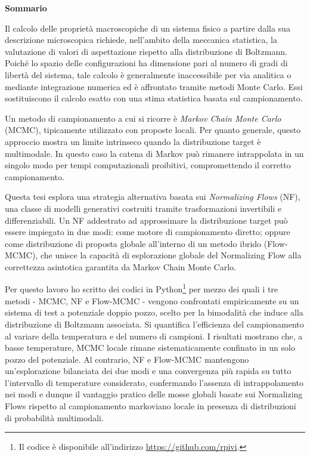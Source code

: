 \blankpage
\vspace*{1cm}
{\filcenter\Huge\bfseries Sommario\par}
\vspace{1cm}

Il calcolo delle proprietà macroscopiche di un sistema fisico a partire dalla sua descrizione microscopica richiede, nell'ambito della meccanica statistica, la valutazione di valori di aspettazione rispetto alla distribuzione di Boltzmann. Poiché lo spazio delle configurazioni ha dimensione pari al numero di gradi di libertà del sistema, tale calcolo è generalmente inaccessibile per via analitica o mediante integrazione numerica ed è affrontato tramite metodi Monte Carlo. Essi sostituiscono il calcolo esatto con una stima statistica basata sul campionamento.
 
Un metodo di campionamento a cui si ricorre è \emph{Markov Chain Monte Carlo} (MCMC), tipicamente utilizzato con proposte locali. Per quanto generale, questo approccio mostra un limite intrinseco quando la distribuzione target è multimodale. In questo caso la catena di Markov può rimanere intrappolata in un singolo modo per tempi computazionali proibitivi, compromettendo il corretto campionamento.
 
Questa tesi esplora una strategia alternativa basata sui \emph{Normalizing Flows} (NF), una classe di modelli generativi costruiti tramite trasformazioni invertibili e differenziabili. Un NF addestrato ad approssimare la distribuzione target può essere impiegato in due modi: come motore di campionamento diretto; oppure come distribuzione di proposta globale all'interno di un metodo ibrido (Flow-MCMC), che unisce la capacità di esplorazione globale del Normalizing Flow alla correttezza asintotica garantita da Markov Chain Monte Carlo.

Per questo lavoro ho scritto dei codici in Python\footnote{Il codice è disponibile all'indirizzo \url{https://github.com/rpivi}.} per mezzo dei quali i tre metodi - MCMC, NF e Flow-MCMC - vengono confrontati empiricamente su un sistema di test a potenziale doppio pozzo, scelto per la bimodalità che induce alla distribuzione di Boltzmann associata. Si quantifica l'efficienza del campionamento al variare della temperatura e del numero di campioni. I risultati mostrano che, a basse temperature, MCMC locale rimane sistematicamente confinato in un solo pozzo del potenziale. Al contrario, NF e Flow-MCMC mantengono un'esplorazione bilanciata dei due modi e una convergenza più rapida su tutto l'intervallo di temperature considerato, confermando l'assenza di intrappolamento nei modi e dunque il vantaggio pratico delle mosse globali basate sui Normalizing Flows rispetto al campionamento markoviano locale in presenza di distribuzioni di probabilità multimodali.